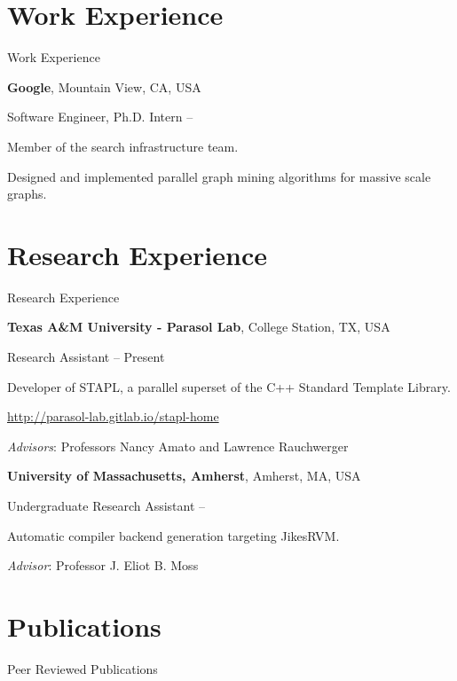 \documentclass[a4paper,10pt,oneside]{article}
\begin{document}
\begin{body}
\section{Work Experience}
{Work Experience}

\textbf{Google},
Mountain View, CA, USA
\par
Software Engineer, Ph.D. Intern
\hfill
{} --
\begin{detail}
Member of the search infrastructure team.
\par
 Designed and implemented parallel graph mining algorithms for massive scale graphs.
 \par
\end{detail}



\section{Research Experience}
{Research Experience}

\textbf{Texas A\&M University - Parasol Lab}, College Station, TX, USA
\par
Research Assistant
\hfill
{} --
Present
\begin{detail}
Developer of STAPL, a parallel superset of the C++ Standard Template Library.
\par
\href{http://parasol-lab.gitlab.io/stapl-home}{http://parasol-lab.gitlab.io/stapl-home}
\par
\emph{Advisors}: Professors Nancy Amato and Lawrence Rauchwerger
\par
\end{detail}
\EntryGap

\textbf{University of Massachusetts, Amherst}, Amherst, MA, USA
\par
Undergraduate Research Assistant
\hfill
{} --
\begin{detail}
Automatic compiler backend generation targeting JikesRVM.
\par
\emph{Advisor}: Professor J. Eliot B. Moss
\par
\end{detail}



\section{Publications}
{Peer Reviewed Publications}


\end{body}
\end{document}
